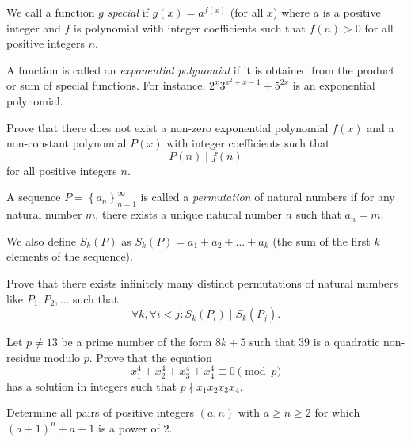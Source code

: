 \documentclass[problems.tex]{subfile}
\begin{document}
	\begin{problem}
		We call a function $g$ \textit{special} if $g(x)=a^{f(x)}$ (for all $x$) where $a$ is a positive integer and $f$ is polynomial with integer coefficients such that $f(n)>0$ for all positive integers $n$.

		A function is called an \textit{exponential polynomial} if it is obtained from the product or sum of special functions. For instance, $2^{x}3^{x^{2}+x-1}+5^{2x}$ is an exponential polynomial.

		Prove that there does not exist a non-zero exponential polynomial $f(x)$ and a non-constant polynomial $P(x)$ with integer coefficients such that
		$$P(n)\mid f(n)$$for all positive integers $n$. %
	\end{problem}

	\begin{problem}
		A sequence $P=\left \{ a_{n} \right \}_{n=1}^{\infty}$ is called a \textit{permutation} of natural numbers if for any natural number $m$, there exists a unique natural number $n$ such that $a_n=m.$

		We also define $S_k(P)$ as
		$S_k(P)=a_{1}+a_{2}+\dots +a_{k}$ (the sum of the first $k$ elements of the sequence).

		Prove that there exists infinitely many distinct permutations of natural numbers like $P_1,P_2, \dots$ such that
		$$\forall k, \forall i<j: S_k(P_i)\mid S_k(P_j).$$
	\end{problem}

	\begin{problem}
		Let $p \neq 13$ be a prime number of the form $8k+5$ such that $39$ is a quadratic non-residue modulo $p$. Prove that the equation $$x_1^4+x_2^4+x_3^4+x_4^4 \equiv 0 \pmod p$$ has a solution in integers such that $p\nmid x_1x_2x_3x_4$. %
	\end{problem}

	\begin{problem}
		Determine all pairs of positive integers $(a,n)$ with $a\ge n\ge 2$ for which $(a+1)^n+a-1$ is a power of $2$. %
	\end{problem}
\end{document}
